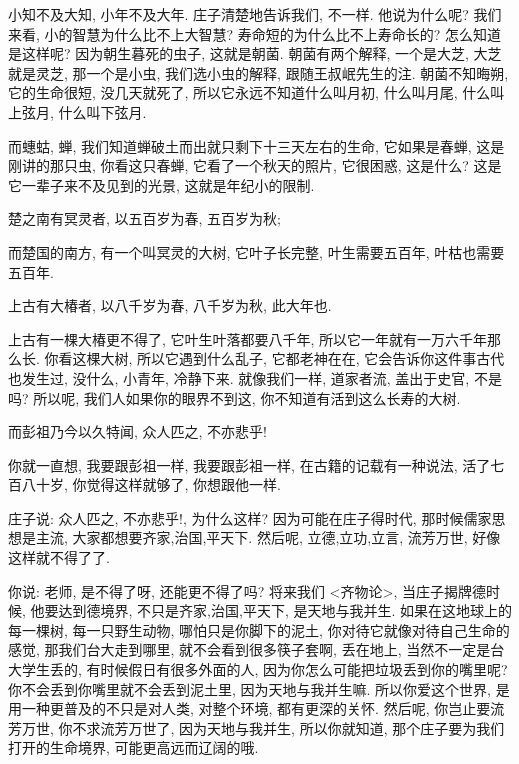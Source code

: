 \documentclass[11pt]{article}
\begin{document}
\vspace{-0.5cm}

{\color{blue} 小知不及大知, 小年不及大年.} 庄子清楚地告诉我们, 不一样. 他说为什么呢? 我们来看, 小的智慧为什么比不上大智慧? 寿命短的为什么比不上寿命长的? 怎么知道是这样呢? 因为朝生暮死的虫子, 这就是朝菌. 朝菌有两个解释, 一个是大芝, 大芝就是灵芝, 那一个是小虫, 我们选小虫的解释, 跟随王叔岷先生的注. {\color{blue} 朝菌不知晦朔}, 它的生命很短, 没几天就死了, 所以它永远不知道什么叫月初, 什么叫月尾, 什么叫上弦月, 什么叫下弦月.

而蟪蛄, 蝉, 我们知道蝉破土而出就只剩下十三天左右的生命, 它如果是春蝉, 这是刚讲的那只虫, 你看这只春蝉, 它看了一个秋天的照片, 它很困惑, 这是什么? 这是它一辈子来不及见到的光景, 这就是年纪小的限制.

\begin{center}
	{\color{magenta} 楚之南有冥灵者, 以五百岁为春, 五百岁为秋;}
\end{center}

\vspace{-0.5cm}

而楚国的南方, 有一个叫冥灵的大树, 它叶子长完整, 叶生需要五百年, 叶枯也需要五百年.

\begin{center}
	{\color{magenta} 上古有大椿者, 以八千岁为春, 八千岁为秋, 此大年也.}
\end{center}

\vspace{-0.5cm}

上古有一棵大椿更不得了, 它叶生叶落都要八千年, 所以它一年就有一万六千年那么长. 你看这棵大树, 所以它遇到什么乱子, 它都老神在在, 它会告诉你这件事古代也发生过, 没什么, 小青年, 冷静下来. 就像我们一样, 道家者流, 盖出于史官, 不是吗? 所以呢, 我们人如果你的眼界不到这, 你不知道有活到这么长寿的大树.

\begin{center}
	{\color{magenta} 而彭祖乃今以久特闻, 众人匹之, 不亦悲乎!}
\end{center}

\vspace{-0.5cm}

你就一直想, 我要跟彭祖一样, 我要跟彭祖一样, 在古籍的记载有一种说法, 活了七百八十岁, 你觉得这样就够了, 你想跟他一样. 

庄子说: {\color{blue} 众人匹之, 不亦悲乎!}, 为什么这样? 因为可能在庄子得时代, 那时候儒家思想是主流, 大家都想要齐家,治国,平天下. 然后呢, 立德,立功,立言, 流芳万世, 好像这样就不得了了. 

你说: 老师, 是不得了呀, 还能更不得了吗? 将来我们 <齐物论>, 当庄子揭牌德时候, 他要达到德境界, 不只是齐家,治国,平天下, 是天地与我并生. 如果在这地球上的每一棵树, 每一只野生动物, 哪怕只是你脚下的泥土, 你对待它就像对待自己生命的感觉, 那我们台大走到哪里, 就不会看到很多筷子套啊, 丢在地上, 当然不一定是台大学生丢的, 有时候假日有很多外面的人, 因为你怎么可能把垃圾丢到你的嘴里呢? 你不会丢到你嘴里就不会丢到泥土里, 因为天地与我并生嘛. 所以你爱这个世界, 是用一种更普及的不只是对人类, 对整个环境, 都有更深的关怀. 然后呢, 你岂止要流芳万世, 你不求流芳万世了, 因为天地与我并生, 所以你就知道, 那个庄子要为我们打开的生命境界, 可能更高远而辽阔的哦. 
\end{document}
